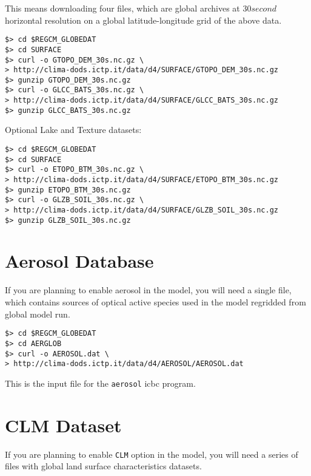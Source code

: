 This means downloading four files, which are global archives at $30 second$
horizontal resolution on a global latitude-longitude grid of the above data.

\begin{Verbatim}
$> cd $REGCM_GLOBEDAT
$> cd SURFACE
$> curl -o GTOPO_DEM_30s.nc.gz \
> http://clima-dods.ictp.it/data/d4/SURFACE/GTOPO_DEM_30s.nc.gz
$> gunzip GTOPO_DEM_30s.nc.gz
$> curl -o GLCC_BATS_30s.nc.gz \
> http://clima-dods.ictp.it/data/d4/SURFACE/GLCC_BATS_30s.nc.gz
$> gunzip GLCC_BATS_30s.nc.gz
\end{Verbatim}

Optional Lake and Texture datasets:

\begin{Verbatim}
$> cd $REGCM_GLOBEDAT
$> cd SURFACE
$> curl -o ETOPO_BTM_30s.nc.gz \
> http://clima-dods.ictp.it/data/d4/SURFACE/ETOPO_BTM_30s.nc.gz
$> gunzip ETOPO_BTM_30s.nc.gz
$> curl -o GLZB_SOIL_30s.nc.gz \
> http://clima-dods.ictp.it/data/d4/SURFACE/GLZB_SOIL_30s.nc.gz
$> gunzip GLZB_SOIL_30s.nc.gz
\end{Verbatim}

\section{Aerosol Database}

If you are planning to enable aerosol in the model, you will need a single
file, which contains sources of optical active species used in the model
regridded from global model run.

\begin{Verbatim}
$> cd $REGCM_GLOBEDAT
$> cd AERGLOB
$> curl -o AEROSOL.dat \
> http://clima-dods.ictp.it/data/d4/AEROSOL/AEROSOL.dat
\end{Verbatim}

This is the input file for the \verb=aerosol= icbc program.

\section{CLM Dataset}
\label{clmdata}

If you are planning to enable \verb=CLM= option in the model, you will need
a series of files with global land surface characteristics datasets.

